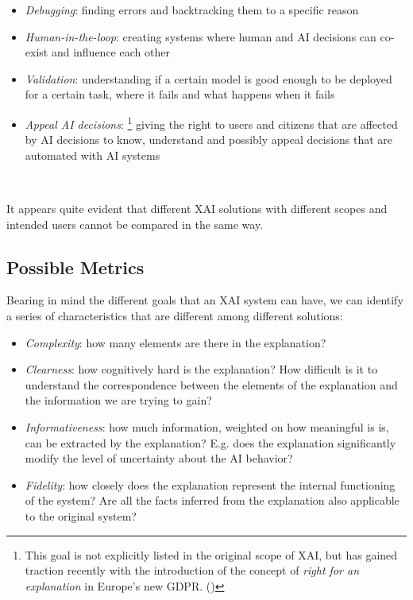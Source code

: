 \documentclass[conference]{IEEEtran}
\begin{document}
\begin{itemize}
    \item \textit{Debugging}: finding errors and backtracking them to a specific reason
    \item \textit{Human-in-the-loop}: creating systems where human and AI
          decisions can co-exist and influence each other
    \item \textit{Validation}: understanding if a certain model is good enough
          to be deployed for a certain task, where it fails and what happens
          when it fails
    \item \textit{Appeal AI decisions}: \footnote{This goal is not
              explicitly listed in the original scope of XAI, but has
              gained traction recently with the introduction of the concept of \textit{right for an explanation} in Europe's new GDPR. (\citet{righttoexpl})} giving the right to
          users and citizens that are affected by AI decisions to know,
          understand and possibly appeal decisions that are automated with
          AI systems
\end{itemize}

\

It appears quite evident that different XAI solutions with different scopes and
intended users cannot be compared in the same way.


\subsection{Possible Metrics}
\label{sec:dimensions}

Bearing in mind the different goals that an XAI system can have, we can identify
a series of characteristics that are different among different solutions:

\begin{itemize}
    \item \textit{Complexity}: how many elements are there in the explanation?
    \item \textit{Clearness}: how cognitively hard is the explanation? How
          difficult is it to understand the correspondence between the elements
          of the explanation and the information we are trying to gain?
    \item \textit{Informativeness}: how much information, weighted on how
          meaningful is is, can be extracted by the explanation? E.g. does the
          explanation significantly modify the level of uncertainty about the AI
          behavior?
    \item \textit{Fidelity}: how closely does the explanation represent the
          internal functioning of the system? Are all the facts inferred from
          the explanation also applicable to the original system?
\end{itemize}
\end{document}
